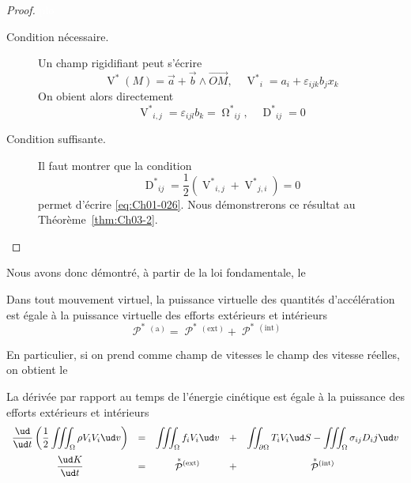 \begin{proof}\textcolor{white}{plo}
    \begin{description}
        \item[Condition nécessaire.] Un champ rigidifiant peut s'écrire 
            \begin{equation}
                \mathop{V}^{\ast}(M) = \vec{a} + \vec{b} \wedge \vec{OM},\quad {\mathop{V}^{\ast}}_i = a_i + \varepsilon_{ijk} b_j x_k
                \label{eq:Ch01-026}
            \end{equation}
            On obient alors directement
            \begin{displaymath}
                {\mathop{V}^{\ast}}_{i,j} = \varepsilon_{ijl}b_k = {\mathop{\Omega}^{\ast}}_{ij},\quad {\mathop{D}^{\ast}}_{ij} = 0
            \end{displaymath}
        \item[Condition suffisante.] Il faut montrer que la condition
            \begin{equation}
                {\mathop{D}^{\ast}}_{ij} = \frac{1}{2} \left( {\mathop{V}^{\ast}}_{i,j} + {\mathop{V}^{\ast}}_{j,i} \right) = 0
                \label{eq:Ch01-027}
            \end{equation}
            permet d'écrire \eqref{eq:Ch01-026}.
            Nous démonstrerons ce résultat au Théorème~\ref{thm:Ch03-2}.
    \end{description}
\end{proof}

Nous avons donc démontré, à partir de la loi fondamentale, le

\begin{thm}
    Dans tout mouvement virtuel, la puissance virtuelle des quantités d'accélération est égale à la puissance virtuelle des efforts extérieurs et intérieurs
    \begin{equation}
        \mathop{\mathcal{P}}^{\ast}{\!}^{(\text{a})} = \mathop{\mathcal{P}}^{\ast}{\!}^{(\text{ext})} + \mathop{\mathcal{P}}^{\ast}{\!}^{(\text{int})}
        \label{eq:Ch01-028}
    \end{equation}
\end{thm}

En particulier, si on prend comme champ de vitesses le champ des vitesse réelles, on obtient le

\begin{thm}
    La dérivée par rapport au temps de l'énergie cinétique est égale à la puissance des efforts extérieurs et intérieurs
\begin{equation}
\everymath{\displaystyle} 
    \begin{array}{ccccc}
        \frac{\ud}{\ud t}\left( \frac{1}{2}\iiint_{\Omega} \rho V_iV_i \ud v\right) &=& \iiint_{\Omega} f_i V_i \ud v &+& \iint_{\partial\Omega} T_i V_i \ud S - \iiint_{\Omega} \sigma_{ij} D_ij \ud v\\[12pt]
        \frac{\ud K}{\ud t}  &=& \mathop{\mathcal{P}}^{\ast}{\!}^{(\text{ext})} &+& \mathop{\mathcal{P}}^{\ast}{\!}^{(\text{int})}
    \end{array}
       \label{eq:Ch01-029}
\end{equation}
\end{thm}
